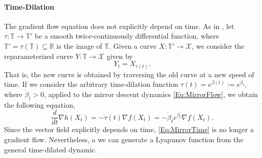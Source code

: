 \documentclass[11pt]{article}
\theoremstyle{plain}
\newcommand{\R}{{\mathbb R}}
\newcommand{\X}{{\mathcal X}}
\begin{document}
\paragraph{Time-Dilation} 
The gradient flow equation does not explicitly depend on time. As in \cite{Acceleration}, let  $\tau: \mathbb{T} \rightarrow \mathbb{T}'$ be a smooth twice-continuously differential function, where $\mathbb{T}' = \tau(\mathbb{T}) \subseteq \R$ is the image of $\mathbb{T}$. Given a curve $X:\mathbb{T}' \rightarrow \X$, we consider the reparameterized curve $Y:\mathbb{T} \rightarrow \X$ given by 
\[Y_t = X_{\tau(t)}.\]
 That is,  the new curve is obtained by traversing the old curve at a new speed of time. If we consider the arbitrary time-dilation function $\tau(t) = e^{\beta(t)}:= e^{\beta_t}$, where $\dot \beta_t >0$, applied to the mirror descent dynamics \eqref{Eq:MirrorFlow}, we obtain the following equation, %
\begin{equation}\label{Eq:MirrorTime}
\frac{d}{dt} \nabla h(X_t) = -\dot \tau(t)\nabla f(X_t) = - \dot \beta_t e^{\beta_t} \nabla f(X_t).
\end{equation}
Since the vector field explicitly depends on time, \eqref{Eq:MirrorTime} is no longer a gradient flow. Nevertheless, a we can generate a Lyapunov function from the general time-dilated dynamic. 
\end{document}

